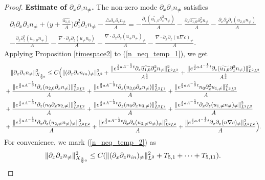 \documentclass[12pt, reqno]{amsart}
\numberwithin{equation}{section}
\begin{document}
\begin{proof}
		{\bf Estimate of $\partial_x\partial_zn_{\neq}$.}
		The non-zero mode $\partial_x\partial_zn_{\neq}$ satisfies 
		\begin{equation}\label{n_neq_temp_1}
			\begin{aligned}
				\partial_t\partial_x\partial_zn_{\neq}+\Big(y+\frac{\widehat{u_{1,0}}}{A}
				\Big)\partial_x^2\partial_z n_{\neq}-\frac{\triangle \partial_x\partial_zn_{\neq}}{A}=
				-\frac{\partial_z(\widetilde{u_{1,0}}\partial_x^2 n_{\neq})}{A}
				-\frac{\partial_z\widehat{u_{1,0}}\partial_x^2 n_{\neq}}{A}
				-\frac{\partial_x\partial_y\partial_z(u_{2,0}n_{\neq})}{A}\\
				-\frac{\partial_x\partial_z^2(
					u_{3,0}n_{\neq})}{A}
				-\frac{\nabla\cdot\partial_x\partial_z(u_{\neq}n_0)}{A}
				-\frac{\nabla\cdot\partial_x\partial_z(u_{\neq}n_{\neq})_{\neq}}{A}
				-\frac{\nabla\cdot\partial_x\partial_z(n\nabla c)_{\neq}}{A}.
			\end{aligned}
		\end{equation}
		Applying Proposition \ref{timespace2} to (\ref{n_neq_temp_1}), we get
		\begin{equation}\label{n_neq_temp_2}
			\begin{aligned}
				&\quad\|\partial_x\partial_zn_{\neq}\|^2_{X_{\frac32a}}\leq C\Big( 	\|(\partial_x\partial_zn_{\rm in})_{\neq}\|^2_{L^2}		
				+\frac{\|{\rm e}^{\frac32aA^{-\frac{1}{3}}t}
					\partial_z\widehat{u_{1,0}}\partial_x^2 	n_{\neq}\|_{L^2L^2}^2}{A^{\frac{5}{3}}}
				+\frac{	\|{\rm e}^{\frac32aA^{-\frac{1}{3}}t}
					\partial_z(\widetilde{u_{1,0}}\partial_x^2 	n_{\neq})\|_{L^2L^2}^2}{A^{\frac{5}{3}}}\\
				&+\frac{\|{\rm e}^{\frac32aA^{-\frac{1}{3}}t}\partial_z(u_{2,0}
					\partial_xn_{\neq})\|_{L^2L^2}^2}{A}
				+\frac{\|{\rm e}^{\frac32aA^{-\frac{1}{3}}t}\partial_z(u_{3,0}
					\partial_xn_{\neq})\|_{L^2L^2}^2}{A}
				+\frac{\|{\rm e}^{\frac32aA^{-\frac{1}{3}}t}
					n_{0}\partial_x^2u_{1,\neq}\|_{L^2L^2}^2}{A}\\
				&+\frac{\|{\rm e}^{\frac32aA^{-\frac{1}{3}}t}
					\partial_z(n_{0}\partial_xu_{2,\neq})\|_{L^2L^2}^2}{A}
				+\frac{\|{\rm e}^{\frac32aA^{-\frac{1}{3}}t}
					\partial_z(n_0\partial_xu_{3,\neq})\|_{L^2L^2}^2}{A}
				+\frac{\|{\rm e}^{\frac32aA^{-\frac{1}{3}}t}
					\partial_x\partial_z(u_{1,\neq}n_{\neq})_{\neq}\|^2_{L^2L^2}}{A}\\
				&+\frac{\|{\rm e}^{\frac32aA^{-\frac{1}{3}}t}
					\partial_x\partial_z(u_{2,\neq}n_{\neq})_{\neq}\|^2_{L^2L^2}}{A}
				+\frac{\|{\rm e}^{\frac32aA^{-\frac{1}{3}}t}
					\partial_x\partial_z(u_{3,\neq}n_{\neq})_{\neq}\|^2_{L^2L^2}}{A}
				+\frac{\|{\rm e}^{\frac32aA^{-\frac{1}{3}}t}
					\partial_x\partial_z(n\nabla c)_{\neq}\|^2_{L^2L^2}}{A}\Big).
			\end{aligned}
		\end{equation}
		For convenience, we mark (\ref{n_neq_temp_2}) as 
		$$\|\partial_x\partial_zn_{\neq}\|^2_{X_{\frac32a}}\leq C(\|(\partial_x\partial_zn_{\rm in})_{\neq}\|^2_{L^2}+T_{5,1}+\cdots+T_{5,11}).$$
		

\end{proof}
\end{document}
